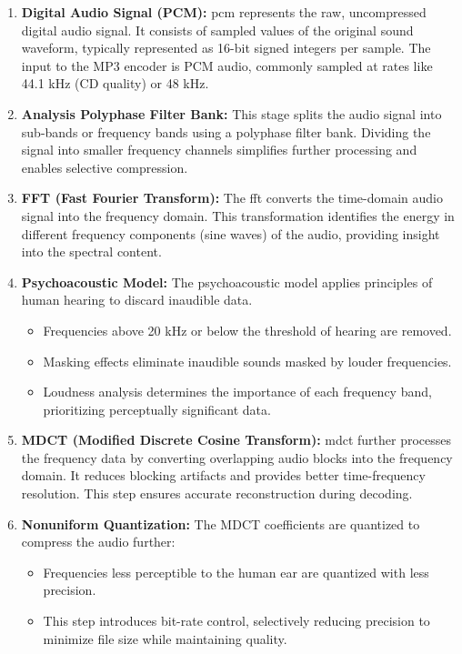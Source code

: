         \begin{enumerate}[label=\textbf{\roman*.}]
            \item \textbf{Digital Audio Signal (PCM):}  
            \gls{pcm} represents the raw, uncompressed digital audio signal. It consists of sampled values of the original sound waveform, typically represented as 16-bit signed integers per sample. The input to the MP3 encoder is PCM audio, commonly sampled at rates like 44.1 kHz (CD quality) or 48 kHz.
        
            \item \textbf{Analysis Polyphase Filter Bank:}  
            This stage splits the audio signal into sub-bands or frequency bands using a polyphase filter bank. Dividing the signal into smaller frequency channels simplifies further processing and enables selective compression.
        
            \item \textbf{FFT (Fast Fourier Transform):}  
            The \gls{fft} converts the time-domain audio signal into the frequency domain. This transformation identifies the energy in different frequency components (sine waves) of the audio, providing insight into the spectral content.
        
            \item \textbf{Psychoacoustic Model:}  
            The psychoacoustic model applies principles of human hearing to discard inaudible data.
            \begin{itemize}
                \item Frequencies above 20 kHz or below the threshold of hearing are removed.
                \item Masking effects eliminate inaudible sounds masked by louder frequencies.
                \item Loudness analysis determines the importance of each frequency band, prioritizing perceptually significant data.
            \end{itemize}
        
            \item \textbf{MDCT (Modified Discrete Cosine Transform):}  
            \gls{mdct} further processes the frequency data by converting overlapping audio blocks into the frequency domain. It reduces blocking artifacts and provides better time-frequency resolution. This step ensures accurate reconstruction during decoding.
        
            \item \textbf{Nonuniform Quantization:}  
            The MDCT coefficients are quantized to compress the audio further:
            \begin{itemize}
                \item Frequencies less perceptible to the human ear are quantized with less precision.
                \item This step introduces bit-rate control, selectively reducing precision to minimize file size while maintaining quality.
            \end{itemize}
        

\end{enumerate}

